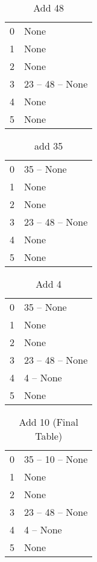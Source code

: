 \documentclass{article}
\begin{document}
		\begin{table}[H]
			\centering
			\caption{Add 48}
			\begin{tabular}{ll}
				0& None\\
				1& None\\
				2& None \\
				3& 23 -- 48 -- None\\
				4& None\\
				5& None\\
			\end{tabular}
		\end{table}
		
			\begin{table}[H]
				\centering
				\caption{add 35}
				\begin{tabular}{ll}
				0& 35 -- None\\
				1& None\\
				2& None\\
				3& 23 -- 48 -- None\\
				4& None\\
				5& None\\
			\end{tabular}
		\end{table}
			
			\begin{table}[H]
				\centering
				\caption{Add 4}
				\begin{tabular}{ll}
				0& 35 -- None\\
				1& None\\
				2&None\\
				3& 23 -- 48 -- None\\
				4& 4 -- None\\
				5& None\\
			\end{tabular}
	\end{table}	
			
			\begin{table}[H]
				\centering
				\caption{Add 10 (Final Table)}
				\begin{tabular}{ll}
				0& 35 -- 10 -- None\\
				1& None\\
				2& None \\
				3& 23 -- 48 -- None\\
				4& 4 -- None\\
				5& None\\
			\end{tabular}
		\end{table}
		
\end{document}
